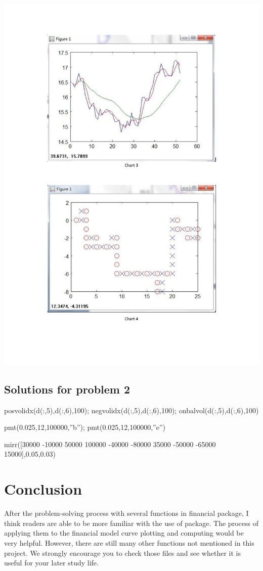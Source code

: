 \documentclass[11pt]{article}
\begin{document}
 \includegraphics[scale=0.4]{Doc2}

\subsection{Solutions for problem 2}
\begin{enumerate}[{[}1{]}] 
\item posvolidx(d(:,5),d(:,6),100); negvolidx(d(:,5),d(:,6),100); onbalvol(d(:,5),d(:,6),100)
\item pmt(0.025,12,100000,”b”); pmt(0.025,12,100000,”e”)
\item mirr([30000 -10000 50000 100000 -40000 -80000 35000 -50000 -65000 15000],0.05,0.03)
\end{enumerate}

\section{Conclusion}
After the problem-solving process with several functions in financial package, I think readers are able to be more familiar with the use of package. The process of applying them to the financial model curve plotting and computing would be very helpful. However, there are still many other functions not mentioned in this project. We strongly encourage you to check those files and see whether it is useful for your later study life. 
\end{document}
